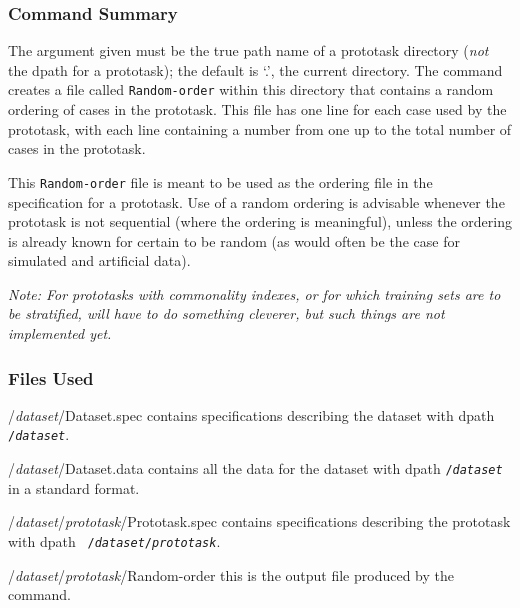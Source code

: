 \subsubsection*{Command Summary}

The argument given must be the true path name of a prototask directory
(\emph{not} the dpath for a prototask); the default is `.', the
current directory.  The \dgenorder{} command creates a file called
\texttt{Random-order} within this directory that contains a random
ordering of cases in the prototask.  This file has one line for each
case used by the prototask, with each line containing a number from
one up to the total number of cases in the prototask.

This \texttt{Random-order} file is meant to be used as the ordering
file in the specification for a prototask.  Use of a random ordering
is advisable whenever the prototask is not sequential (where the
ordering is meaningful), unless the ordering is already known for
certain to be random (as would often be the case for simulated and
artificial data).

{\em Note: For prototasks with commonality indexes, or for which
training sets are to be stratified, \dgenorder{} will have to do
something cleverer, but such things are not implemented yet.}

\subsubsection*{Files Used}
\begin{ttdescription}
\item[/{\rm\em dataset\/}/Dataset.spec]
    contains specifications describing the dataset with dpath
    \texttt{/{\rm\em dataset}}.
\item[/{\rm\em dataset\/}/Dataset.data]
    contains all the data for the dataset with dpath
    \texttt{/{\rm\em dataset}} in a \delve{} standard format.  
\item[/{\rm\em dataset\/}/{\rm\em prototask\/}/Prototask.spec]
    contains specifications describing the prototask with dpath {\tt
    /{\rm\em dataset\/}/{\rm\em prototask}}.
\item[/{\rm\em dataset\/}/{\rm\em prototask\/}/Random-order]
    this is the output file produced by the command.
\end{ttdescription}

%
%


